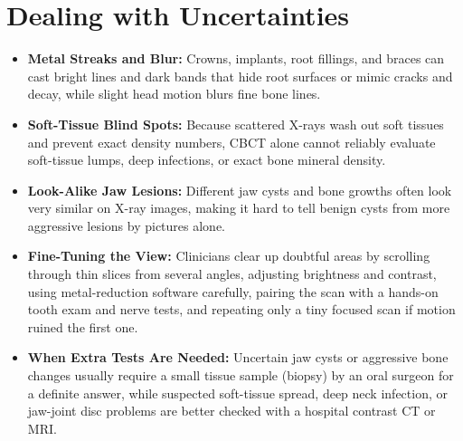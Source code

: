 \section{Dealing with Uncertainties}
\begin{itemize}
    \item \textbf{Metal Streaks and Blur:} Crowns, implants, root fillings, and braces can cast bright lines and dark bands that hide root surfaces or mimic cracks and decay, while slight head motion blurs fine bone lines.
    \item \textbf{Soft-Tissue Blind Spots:} Because scattered X-rays wash out soft tissues and prevent exact density numbers, CBCT alone cannot reliably evaluate soft-tissue lumps, deep infections, or exact bone mineral density.
    \item \textbf{Look-Alike Jaw Lesions:} Different jaw cysts and bone growths often look very similar on X-ray images, making it hard to tell benign cysts from more aggressive lesions by pictures alone.
    \item \textbf{Fine-Tuning the View:} Clinicians clear up doubtful areas by scrolling through thin slices from several angles, adjusting brightness and contrast, using metal-reduction software carefully, pairing the scan with a hands-on tooth exam and nerve tests, and repeating only a tiny focused scan if motion ruined the first one.
    \item \textbf{When Extra Tests Are Needed:} Uncertain jaw cysts or aggressive bone changes usually require a small tissue sample (biopsy) by an oral surgeon for a definite answer, while suspected soft-tissue spread, deep neck infection, or jaw-joint disc problems are better checked with a hospital contrast CT or MRI.
\end{itemize}

